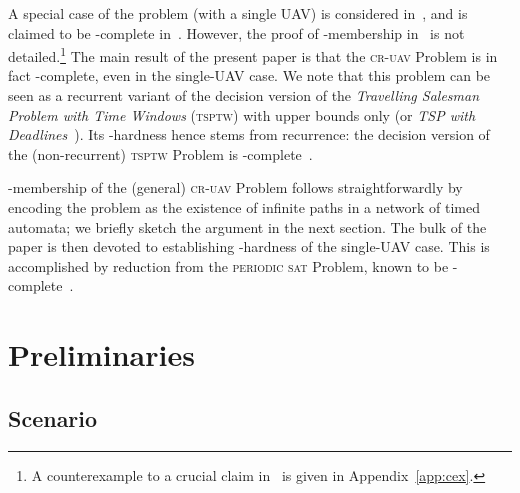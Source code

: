 \documentclass[envcountsame]{llncs}
\begin{document}
A special case of the problem (with a single UAV) is considered
in~\cite{Basilico2009, Basilico2012, Fargeas2013}, and is claimed to
be -complete in~\cite{Basilico2012}.  However, the proof
of -membership in~\cite{Basilico2012} is not
detailed.\footnote{A counterexample to a crucial claim
  in~\cite{Basilico2012} is given in Appendix~\ref{app:cex}.}  The
main result of the present paper is that the \textsc{cr-uav} Problem is
in fact -complete, even in the single-UAV case.
We note that this problem can be seen as a recurrent variant of the
decision version of the \emph{Travelling Salesman Problem with Time
  Windows} (\textsc{tsptw}) with upper bounds only (or \emph{TSP with Deadlines}~\cite{Bockenhauer2007}).  Its
-hardness hence stems from recurrence: the decision
version of the (non-recurrent) \textsc{tsptw} Problem is
-complete~\cite{Savelsbergh1985}.



-membership of the (general) \textsc{cr-uav} Problem
follows straightforwardly by encoding the problem as the existence of
infinite paths in a network of timed automata; we briefly sketch the
argument in the next section. The bulk of the paper is then
devoted to establishing -hardness of the single-UAV
case. This is accomplished by reduction from the \textsc{periodic sat}
Problem, known to be -complete~\cite{Orlin1981}.

\section{Preliminaries}



\subsection{Scenario}
\end{document}
